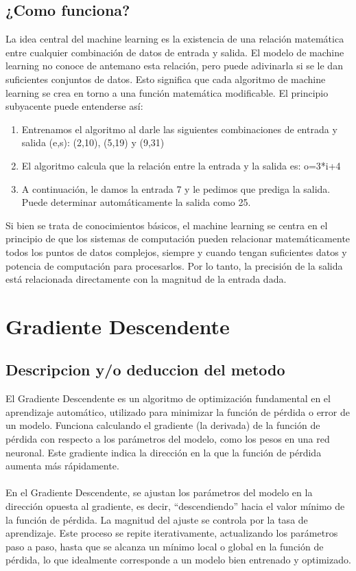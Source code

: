 \documentclass[conference]{IEEEtran}
\begin{document}
\subsection{¿Como funciona?}
 La idea central del machine learning es la existencia de una relación matemática entre cualquier combinación de datos de entrada y salida. El modelo de machine learning no conoce de antemano esta relación, pero puede adivinarla si se le dan suficientes conjuntos de datos. Esto significa que cada algoritmo de machine learning se crea en torno a una función matemática modificable. El principio subyacente puede entenderse así:
\begin{enumerate}
  \item Entrenamos el algoritmo al darle las siguientes combinaciones de entrada y salida (e,s): (2,10), (5,19) y (9,31)
  \item El algoritmo calcula que la relación entre la entrada y la salida es: o=3*i+4
  \item A continuación, le damos la entrada 7 y le pedimos que prediga la salida. Puede determinar automáticamente la salida como 25.
\end{enumerate}

 Si bien se trata de conocimientos básicos, el machine learning se centra en el principio de que los sistemas de computación pueden relacionar matemáticamente todos los puntos de datos complejos, siempre y cuando tengan suficientes datos y potencia de computación para procesarlos. Por lo tanto, la precisión de la salida está relacionada directamente con la magnitud de la entrada dada.

\section{Gradiente Descendente}
\subsection{Descripcion y/o deduccion del metodo}

 El Gradiente Descendente es un algoritmo de optimización fundamental en el aprendizaje automático, utilizado para minimizar la función de pérdida o error de un modelo. Funciona calculando el gradiente (la derivada) de la función de pérdida con respecto a los parámetros del modelo, como los pesos en una red neuronal. Este gradiente indica la dirección en la que la función de pérdida aumenta más rápidamente. \\\\
En el Gradiente Descendente, se ajustan los parámetros del modelo en la dirección opuesta al gradiente, es decir, “descendiendo” hacia el valor mínimo de la función de pérdida. La magnitud del ajuste se controla por la tasa de aprendizaje. Este proceso se repite iterativamente, actualizando los parámetros paso a paso, hasta que se alcanza un mínimo local o global en la función de pérdida, lo que idealmente corresponde a un modelo bien entrenado y optimizado.
\end{document}
